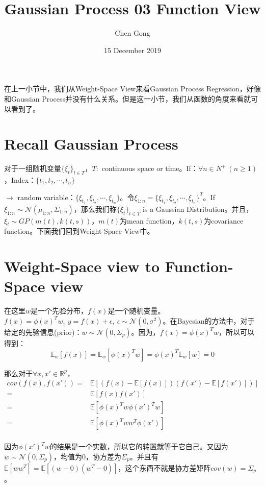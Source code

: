 \documentclass[a4paper]{article}
\title{Gaussian Process 03 Function View}
\author{Chen Gong}
\date{15 December 2019}
\begin{document}
\maketitle
在上一小节中，我们从Weight-Space View来看Gaussian Process Regression，好像和Gaussian Process并没有什么关系。但是这一小节，我们从函数的角度来看就可以看到了。
\section{Recall Gaussian Process}
对于一组随机变量$\{ \xi_t \}_{t\in T}$，$T:$ continuous space or time。If：$\forall n \in N^+ \ (n\geq 1)$，Index：$\{t_1,t_2,\cdots,t_n \}$

\noindent $\longrightarrow$ random variable：$\{\xi_{t_1},\xi_{t_2},\cdots,\xi_{t_n}\}$。令$\xi_{1:n} = \{\xi_{t_1},\xi_{t_2},\cdots,\xi_{t_n}\}^T$。If $\xi_{1:n} \sim \mathcal{N}(\mu_{1:n},\Sigma_{1:n})$，那么我们称$\{ \xi_t \}_{t\in T}$ is a Gaussian Distribution。并且，$\xi_t \sim GP(m(t),k(t,s))$，$m(t)$为mean function，$k(t,s)$为covariance function。下面我们回到Weight-Space View中。

\section{Weight-Space view to Function-Space view}
在这里$w$是一个先验分布，$f(x)$是一个随机变量。$f(x) = \phi(x)^Tw,\ y = f(x)+\epsilon,\ \epsilon \sim \mathcal{N}(0,\sigma^2)$。在Bayesian的方法中，对于给定的先验信息(prior)：$w\sim \mathcal{N}(0,\Sigma_p)$。因为，$f(x) = \phi(x)^Tw$，所以可以得到：
\begin{equation}
    \mathbb{E}_w[f(x)] = \mathbb{E}_w[\phi(x)^Tw] =  \phi(x)^T\mathbb{E}_w[w] = 0
\end{equation}

那么对于$\forall x,x'\in \mathbb{R}^p$，
\begin{equation}
    \begin{split}
        cov(f(x),f(x')) 
        = & \mathbb{E}[(f(x)-\mathbb{E}[f(x)])(f(x')-\mathbb{E}[f(x')])] \\
        = & \mathbb{E}[f(x)f(x')] \\
        = & \mathbb{E}[\phi(x)^Tw\phi(x')^Tw] \\
        = & \mathbb{E}[\phi(x)^Tww^T\phi(x')] \\
    \end{split}
\end{equation}

因为$\phi(x')^Tw$的结果是一个实数，所以它的转置就等于它自己。又因为$w\sim \mathcal{N}(0,\Sigma_p)$，均值为0，协方差为$\Sigma_p$。并且有$\mathbb{E}[ww^T] = \mathbb{E}[(w-0)(w^T-0)]$，这个东西不就是协方差矩阵$cov(w) = \Sigma_p$。
\end{document}
